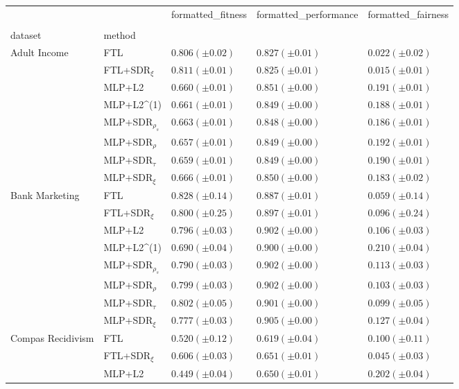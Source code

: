 \begin{tabular}{lllll}
\toprule
 &  & formatted_fitness & formatted_performance & formatted_fairness \\
 &  &  &  &  \\
dataset & method &  &  &  \\
\midrule
\multirow[t]{8}{*}{Adult Income} & FTL & $0.806 (\pm0.02)$ & $0.827 (\pm0.01)$ & $0.022 (\pm0.02)$ \\
 & FTL+SDR$_{\xi}$ & $0.811 (\pm0.01)$ & $0.825 (\pm0.01)$ & $0.015 (\pm0.01)$ \\
 & MLP+L2 & $0.660 (\pm0.01)$ & $0.851 (\pm0.00)$ & $0.191 (\pm0.01)$ \\
 & MLP+L2^{(1)} & $0.661 (\pm0.01)$ & $0.849 (\pm0.00)$ & $0.188 (\pm0.01)$ \\
 & MLP+SDR$_{\rho_s}$ & $0.663 (\pm0.01)$ & $0.848 (\pm0.00)$ & $0.186 (\pm0.01)$ \\
 & MLP+SDR$_{\rho}$ & $0.657 (\pm0.01)$ & $0.849 (\pm0.00)$ & $0.192 (\pm0.01)$ \\
 & MLP+SDR$_{\tau}$ & $0.659 (\pm0.01)$ & $0.849 (\pm0.00)$ & $0.190 (\pm0.01)$ \\
 & MLP+SDR$_{\xi}$ & $0.666 (\pm0.01)$ & $0.850 (\pm0.00)$ & $0.183 (\pm0.02)$ \\
\cline{1-5}
\multirow[t]{8}{*}{Bank Marketing} & FTL & $0.828 (\pm0.14)$ & $0.887 (\pm0.01)$ & $0.059 (\pm0.14)$ \\
 & FTL+SDR$_{\xi}$ & $0.800 (\pm0.25)$ & $0.897 (\pm0.01)$ & $0.096 (\pm0.24)$ \\
 & MLP+L2 & $0.796 (\pm0.03)$ & $0.902 (\pm0.00)$ & $0.106 (\pm0.03)$ \\
 & MLP+L2^{(1)} & $0.690 (\pm0.04)$ & $0.900 (\pm0.00)$ & $0.210 (\pm0.04)$ \\
 & MLP+SDR$_{\rho_s}$ & $0.790 (\pm0.03)$ & $0.902 (\pm0.00)$ & $0.113 (\pm0.03)$ \\
 & MLP+SDR$_{\rho}$ & $0.799 (\pm0.03)$ & $0.902 (\pm0.00)$ & $0.103 (\pm0.03)$ \\
 & MLP+SDR$_{\tau}$ & $0.802 (\pm0.05)$ & $0.901 (\pm0.00)$ & $0.099 (\pm0.05)$ \\
 & MLP+SDR$_{\xi}$ & $0.777 (\pm0.03)$ & $0.905 (\pm0.00)$ & $0.127 (\pm0.04)$ \\
\cline{1-5}
\multirow[t]{8}{*}{Compas Recidivism} & FTL & $0.520 (\pm0.12)$ & $0.619 (\pm0.04)$ & $0.100 (\pm0.11)$ \\
 & FTL+SDR$_{\xi}$ & $0.606 (\pm0.03)$ & $0.651 (\pm0.01)$ & $0.045 (\pm0.03)$ \\
 & MLP+L2 & $0.449 (\pm0.04)$ & $0.650 (\pm0.01)$ & $0.202 (\pm0.04)$ \\

\end{tabular}
